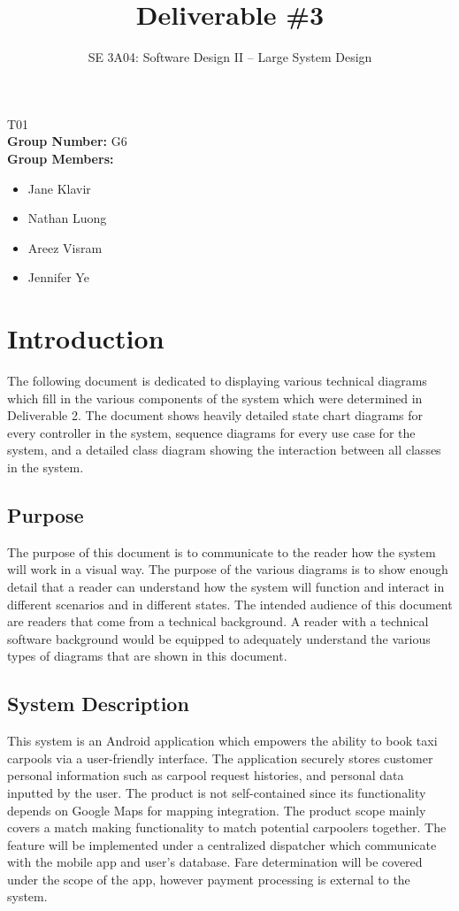 \documentclass[]{article}
\title{Deliverable \#3}
\author{SE 3A04: Software Design II -- Large System Design}
\date{}
\begin{document}
\maketitle	
{} T01\\
{\bf Group Number:} G6 \\
{\bf Group Members:} 
\begin{itemize}
	\item Jane Klavir
	\item Nathan Luong
	\item Areez Visram
	\item Jennifer Ye
\end{itemize}

\section{Introduction}
\label{sec:introduction}

The following document is dedicated to displaying various technical diagrams which fill in the various components of the system which were determined in Deliverable 2. The document shows heavily detailed state chart diagrams for every controller in the system, sequence diagrams for every use case for the system, and a detailed class diagram showing the interaction between all classes in the system.

\subsection{Purpose}
\label{sub:purpose}
The purpose of this document is to communicate to the reader how the system will work in a visual way. The purpose of the various diagrams is to show enough detail that a reader can understand how the system will function and interact in different scenarios and in different states. The intended audience of this document are readers that come from a technical background. A reader with a technical software background would be equipped to adequately understand the various types of diagrams that are shown in this document.

\subsection{System Description}
\label{sub:system_description}
This system is an Android application which empowers the ability to book taxi carpools via a user-friendly interface. The application securely stores customer personal information such as carpool request histories, and personal data inputted by the user. The product is not self-contained since its functionality depends on Google Maps for mapping integration. The product scope mainly covers a match making functionality to match potential carpoolers together. The feature will be implemented under a centralized dispatcher which communicate with the mobile app and user’s database. Fare determination will be covered under the scope of the app, however payment processing is external to the system.
\end{document}
